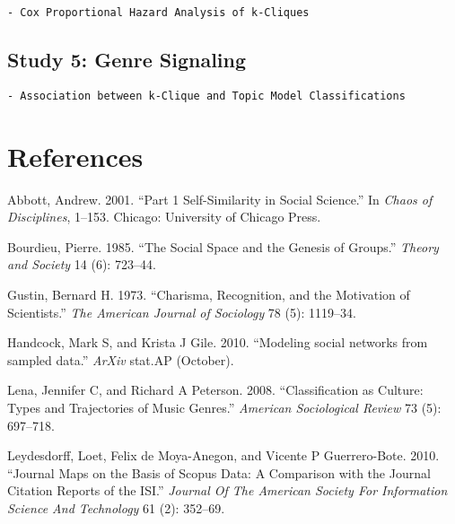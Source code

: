\begin{verbatim}
- Cox Proportional Hazard Analysis of k-Cliques
\end{verbatim}

\subsection{Study 5: Genre Signaling}\label{study-5-genre-signaling}

\begin{verbatim}
- Association between k-Clique and Topic Model Classifications
\end{verbatim}

\section*{References}\label{references}

\hypertarget{refs}{}
\hypertarget{ref-Abbott:2001uy}{}
Abbott, Andrew. 2001. ``Part 1 Self-Similarity in Social Science.'' In
\emph{Chaos of Disciplines}, 1--153. Chicago: University of Chicago
Press.

\hypertarget{ref-Bourdieu:1985wh}{}
Bourdieu, Pierre. 1985. ``The Social Space and the Genesis of Groups.''
\emph{Theory and Society} 14 (6): 723--44.

\hypertarget{ref-Gustin:1973ul}{}
Gustin, Bernard H. 1973. ``Charisma, Recognition, and the Motivation of
Scientists.'' \emph{The American Journal of Sociology} 78 (5): 1119--34.

\hypertarget{ref-Handcock:2010iw}{}
Handcock, Mark S, and Krista J Gile. 2010. ``Modeling social networks
from sampled data.'' \emph{ArXiv} stat.AP (October).

\hypertarget{ref-Lena:2008er}{}
Lena, Jennifer C, and Richard A Peterson. 2008. ``Classification as
Culture: Types and Trajectories of Music Genres.'' \emph{American
Sociological Review} 73 (5): 697--718.

\hypertarget{ref-Leydesdorff:2010ci}{}
Leydesdorff, Loet, Felix de Moya-Anegon, and Vicente P Guerrero-Bote.
2010. ``Journal Maps on the Basis of Scopus Data: A Comparison with the
Journal Citation Reports of the ISI.'' \emph{Journal Of The American
Society For Information Science And Technology} 61 (2): 352--69.
